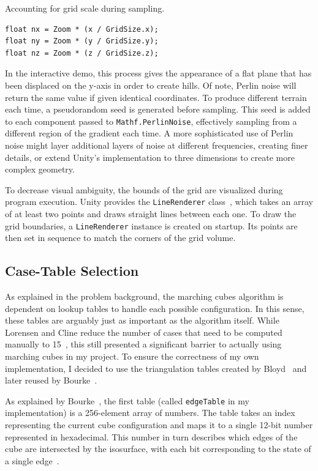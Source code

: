 \documentclass[pageno]{jpaper}
\begin{document}
\begin{listing}[H]
\linespread{1.0}
\caption{Accounting for grid scale during sampling.}
\begin{verbatim}
float nx = Zoom * (x / GridSize.x);
float ny = Zoom * (y / GridSize.y);
float nz = Zoom * (z / GridSize.z);
\end{verbatim}
\label{lst:zoom}
\end{listing}

In the interactive demo, this process gives the appearance of a flat plane that has been displaced on the y-axis in order to create hills. Of note, Perlin noise will return the same value if given identical coordinates. To produce different terrain each time, a pseudorandom seed is generated before sampling. This seed is added to each component passed to \texttt{Mathf.PerlinNoise}, effectively sampling from a different region of the gradient each time. A more sophisticated use of Perlin noise might layer additional layers of noise at different frequencies, creating finer details, or extend Unity's implementation to three dimensions to create more complex geometry.

To decrease visual ambiguity, the bounds of the grid are visualized during program execution. Unity provides the \texttt{LineRenderer} class~\cite{unityline}, which takes an array of at least two points and draws straight lines between each one. To draw the grid boundaries, a \texttt{LineRenderer} instance is created on startup. Its points are then set in sequence to match the corners of the grid volume.

\subsection{Case-Table Selection}

As explained in the problem background, the marching cubes algorithm is dependent on lookup tables to handle each possible configuration. In this sense, these tables are arguably just as important as the algorithm itself. While Lorensen and Cline reduce the number of cases that need to be computed manually to 15~\cite{lorensen,kieran}, this still presented a significant barrier to actually using marching cubes in my project. To ensure the correctness of my own implementation, I decided to use the triangulation tables created by Bloyd~\cite{bloyd} and later reused by Bourke~\cite{bourke}. 

As explained by Bourke~\cite{bourke}, the first table (called \texttt{edgeTable} in my implementation) is a 256-element array of numbers. The table takes an index representing the current cube configuration and maps it to a single 12-bit number represented in hexadecimal. This number in turn describes which edges of the cube are intersected by the isosurface, with each bit corresponding to the state of a single edge~\cite{bourke}.
\end{document}

